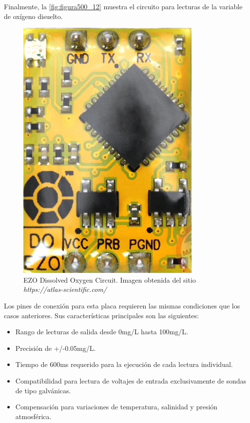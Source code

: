 Finalmente, la \autoref{fig:figura500_12} muestra el circuito para lecturas de la variable de oxígeno disuelto.

\clearpage

\begin{figure}[h]
	\centering
	\includegraphics[scale=0.7]{imgss212.png}
	\caption{EZO Dissolved Oxygen Circuit. Imagen obtenida del sitio \textit{https://atlas-scientific.com/}}
	\label{fig:figura500_12}
\end{figure}

Los pines de conexión para esta placa requieren las mismas condiciones que los casos anteriores. Sus características principales son las siguientes:

\begin{itemize}
    \item Rango de lecturas de salida desde 0mg/L hasta 100mg/L. 
    \item Precisión de +/-0.05mg/L.
    \item Tiempo de 600ms requerido para la ejecución de cada lectura individual.
    \item Compatibilidad para lectura de voltajes de entrada exclusivamente de sondas de tipo galvánicas.
    \item Compensación para variaciones de temperatura, salinidad y presión atmosférica.
\end{itemize}

